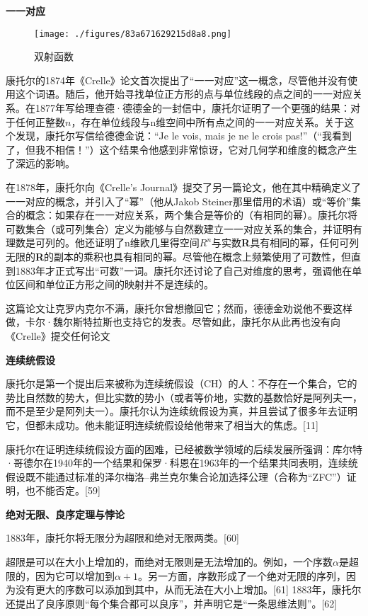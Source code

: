 \textbf{一一对应}

\begin{figure}[ht]
\centering
\texttt{[image: ./figures/83a671629215d8a8.png]}
\caption{双射函数} \label{fig_Canto_5}
\end{figure}
康托尔的1874年《Crelle》论文首次提出了“一一对应”这一概念，尽管他并没有使用这个词语。随后，他开始寻找单位正方形的点与单位线段的点之间的一一对应关系。在1877年写给理查德·德德金的一封信中，康托尔证明了一个更强的结果：对于任何正整数\(n\)，存在单位线段与n维空间中所有点之间的一一对应关系。关于这个发现，康托尔写信给德德金说：“Je le vois, mais je ne le crois pas!”（“我看到了，但我不相信！”）这个结果令他感到非常惊讶，它对几何学和维度的概念产生了深远的影响。

在1878年，康托尔向《Crelle's Journal》提交了另一篇论文，他在其中精确定义了一一对应的概念，并引入了“幂”（他从Jakob Steiner那里借用的术语）或“等价”集合的概念：如果存在一一对应关系，两个集合是等价的（有相同的幂）。康托尔将可数集合（或可列集合）定义为能够与自然数建立一一对应关系的集合，并证明有理数是可列的。他还证明了n维欧几里得空间\(R^n\)与实数\textbf{R}具有相同的幂，任何可列无限的\textbf{R}的副本的乘积也具有相同的幂。尽管他在概念上频繁使用了可数性，但直到1883年才正式写出“可数”一词。康托尔还讨论了自己对维度的思考，强调他在单位区间和单位正方形之间的映射并不是连续的。

这篇论文让克罗内克尔不满，康托尔曾想撤回它；然而，德德金劝说他不要这样做，卡尔·魏尔斯特拉斯也支持它的发表。尽管如此，康托尔从此再也没有向《Crelle》提交任何论文

\textbf{连续统假设}

康托尔是第一个提出后来被称为连续统假设（CH）的人：不存在一个集合，它的势比自然数的势大，但比实数的势小（或者等价地，实数的基数恰好是阿列夫一，而不是至少是阿列夫一）。康托尔认为连续统假设为真，并且尝试了很多年去证明它，但都未成功。他未能证明连续统假设给他带来了相当大的焦虑。[11]

康托尔在证明连续统假设方面的困难，已经被数学领域的后续发展所强调：库尔特·哥德尔在1940年的一个结果和保罗·科恩在1963年的一个结果共同表明，连续统假设既不能通过标准的泽尔梅洛–弗兰克尔集合论加选择公理（合称为“ZFC”）证明，也不能否定。[59]

\textbf{绝对无限、良序定理与悖论}

1883年，康托尔将无限分为超限和绝对无限两类。[60]

超限是可以在大小上增加的，而绝对无限则是无法增加的。例如，一个序数\(\alpha\)是超限的，因为它可以增加到\(\alpha+1\)。另一方面，序数形成了一个绝对无限的序列，因为没有更大的序数可以添加到其中，从而无法在大小上增加。[61] 1883年，康托尔还提出了良序原则“每个集合都可以良序”，并声明它是“一条思维法则”。[62]

